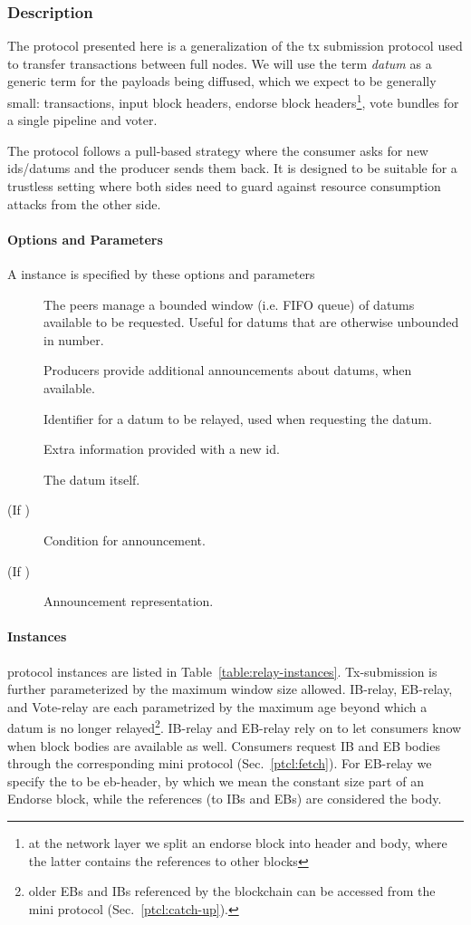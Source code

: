 \subsubsection{Description}
The \relay protocol presented here is a generalization of the tx
submission protocol used to transfer transactions between full
nodes. We will use the term \emph{datum} as a generic term for the
payloads being diffused, which we expect to be generally small:
transactions, input block headers, endorse block headers\footnote{at
the network layer we split an endorse block into header and body,
where the latter contains the references to other blocks}, vote
bundles for a single pipeline and voter.

The protocol follows a pull-based strategy where the consumer asks for
new ids/datums and the producer sends them back. It is designed to be
suitable for a trustless setting where both sides need to guard
against resource consumption attacks from the other side.

\paragraph{Options and Parameters} A \relay{} instance is specified by these options and parameters
\begin{description}
\item [\BoundedWindow] The peers manage a bounded window (i.e. FIFO queue) of datums available to be requested. Useful for datums that are otherwise unbounded in number.
\item [\Announcements] Producers provide additional announcements about datums, when available.
\item [\id{}] Identifier for a datum to be relayed, used when requesting the datum.
\item [\info{}] Extra information provided with a new id.
\item [\datum{}] The datum itself.
\item [\annCond{} (If \Announcements)] Condition for announcement.
\item [\ann{} (If \Announcements)] Announcement representation.
\end{description}

\paragraph{Instances} \relay{} protocol instances are listed in Table~\ref{table:relay-instances}.
Tx-submission is further parameterized by the maximum window size
allowed. IB-relay, EB-relay, and Vote-relay are each parametrized by
the maximum age beyond which a datum is no longer
relayed\footnote{older EBs and IBs referenced by the blockchain can be
accessed from the \catchup{} mini protocol (Sec.~\ref{ptcl:catch-up}).}. IB-relay and
EB-relay rely on \Announcements{} to let consumers know when block bodies
are available as well. Consumers request IB and EB bodies through the corresponding
\fetch{} mini protocol (Sec.~\ref{ptcl:fetch}). For EB-relay we specify the \datum{} to be eb-header, by which we mean the constant size part of an Endorse block, while the references (to IBs and EBs) are considered the body.


